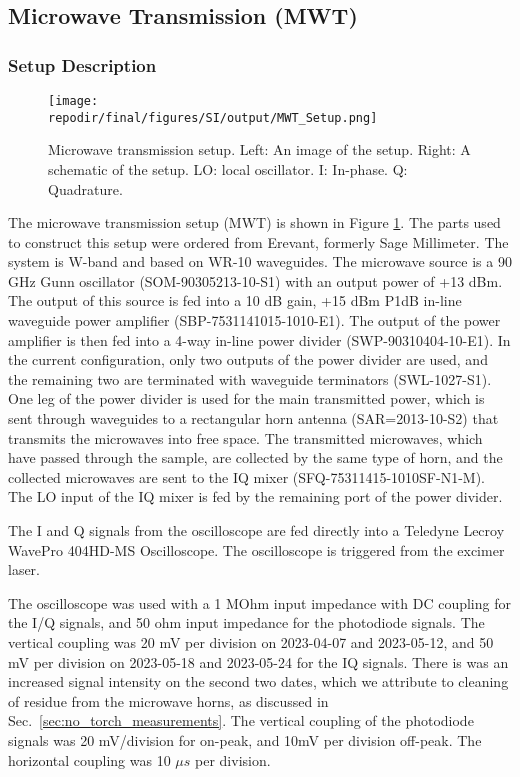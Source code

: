\clearpage
\subsection{Microwave Transmission (MWT)}


\subsubsection{Setup Description}
\begin{figure}[]
\centering
\texttt{[image: \\repodir/final/figures/SI/output/MWT\_Setup.png]}
\caption{Microwave transmission setup. Left: An image of the setup. Right: A schematic of the setup. LO: local oscillator. I: In-phase. Q: Quadrature.  }
\label{fig:SI_MWT_Setup}
\end{figure}

The microwave transmission setup (MWT) is shown in Figure \ref{fig:SI_MWT_Setup}. The parts used to construct this setup were ordered from Erevant, formerly Sage Millimeter. The system is W-band and based on WR-10 waveguides. The microwave source is a 90 GHz Gunn oscillator (SOM-90305213-10-S1) with an output power of +13 dBm. The output of this source is fed into a 10 dB gain, +15 dBm P1dB in-line waveguide power amplifier (SBP-7531141015-1010-E1). The output of the power amplifier is then fed into a 4-way in-line power divider (SWP-90310404-10-E1). In the current configuration, only two outputs of the power divider are used, and the remaining two are terminated with waveguide terminators (SWL-1027-S1). One leg of the power divider is used for the main transmitted power, which is sent through waveguides to a rectangular horn antenna (SAR=2013-10-S2) that transmits the microwaves into free space. The transmitted microwaves, which have passed through the sample, are collected by the same type of horn, and the collected microwaves are sent to the IQ mixer (SFQ-75311415-1010SF-N1-M). The LO input of the IQ mixer is fed by the remaining port of the power divider. 


The I and Q signals from the oscilloscope are fed directly into a Teledyne Lecroy WavePro 404HD-MS Oscilloscope.  The oscilloscope is triggered from the excimer laser. 

The oscilloscope was used with a 1 MOhm input impedance with DC coupling for the I/Q signals, and 50 ohm input impedance for the photodiode signals. The vertical coupling was 20 mV per division on 2023-04-07 and 2023-05-12, and 50 mV per division on 2023-05-18 and 2023-05-24 for the IQ signals. There is was an increased signal intensity on the second two dates, which we attribute to cleaning of residue from the microwave horns, as discussed in Sec.\ \ref{sec:no_torch_measurements}. The vertical coupling of the photodiode signals was 20 mV/division for on-peak, and 10mV per division off-peak. The horizontal coupling was 10 $\mu s$ per division. 

